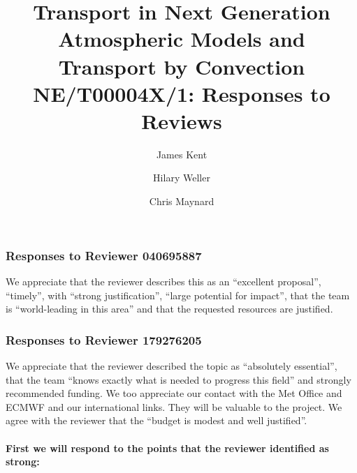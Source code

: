 

\title{Transport in Next Generation Atmospheric Models and Transport by Convection\\
NE/T00004X/1: Responses to Reviews
}
\author
{
    James Kent \and Hilary Weller \and Chris Maynard
}
\date{}
\maketitle

\subsubsection*{Responses to Reviewer 040695887}

We appreciate that the reviewer describes this as an ``excellent proposal'', ``timely'', with ``strong justification'', ``large potential for impact'', that the team is ``world-leading in this area'' and that the requested resources are justified.

\subsubsection*{Responses to Reviewer 179276205}

We appreciate that the reviewer described the topic as ``absolutely essential'', that the team ``knows exactly what is needed to progress this field'' and strongly recommended funding. We too appreciate our contact with the Met Office and ECMWF and our international links. They will be valuable to the project. We agree with the reviewer that the ``budget is modest and well justified''.

\paragraph*{First we will respond to the points that the reviewer identified as strong:}

